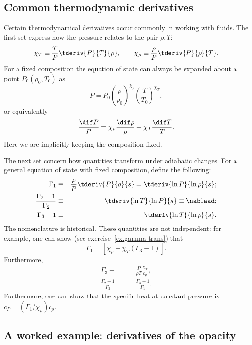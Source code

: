 \subsection{Common thermodynamic derivatives}

Certain thermodynamical derivatives occur commonly in working with fluids. The first set express how the pressure relates to the pair $\rho,T$:
\begin{equation}
\chi_{T}\equiv\frac{T}{P}\tderiv{P}{T}{\rho},\qquad\chi_{\rho}\equiv\frac{\rho}{P}\tderiv{P}{\rho}{T}.
\end{equation}
For a fixed composition the equation of state can always be expanded about a point $P_{0}(\rho_{0},T_{0})$ as
\begin{equation}\label{e.eos}
P = P_{0}\left(\frac{\rho}{\rho_{0}}\right)^{\chi_{\rho}}\left(\frac{T}{T_{0}}\right)^{\chi_{T}},
\end{equation}
or equivalently
\[
\frac{\dif P}{P} = \chi_{\rho}\frac{\dif \rho}{\rho} + \chi_{T}\frac{\dif T}{T}.
\]
Here we are implicitly keeping the composition fixed.

The next set concern how quantities transform under adiabatic changes.  For a general equation of state with fixed composition, define the following:
\begin{eqnarray}
\Gamma_{1} &\equiv& \frac{\rho}{P}\tderiv{P}{\rho}{s} = \tderiv{\ln P}{\ln\rho}{s};\\
\frac{\Gamma_{2}-1}{\Gamma_{2}} &\equiv& \tderiv{\ln T}{\ln P}{s} \equiv \nablaad;\\
\Gamma_{3}-1 &\equiv& \tderiv{\ln T}{\ln \rho}{s}.
\end{eqnarray}
The nomenclature is historical. These quantities are not independent: for example, one can show (see exercise~\ref{ex.gamma-trans}) that
\[
\Gamma_{1} = \left[\chi_{\rho} + \chi_{T}\left(\Gamma_{3}-1\right)\right].
\]
Furthermore,
\begin{eqnarray*}
\Gamma_{3}-1 &=& \frac{P}{\rho T}\frac{\chi_{T}}{c_{\rho}},\\
\frac{\Gamma_{2}-1}{\Gamma_{2}} &=& \frac{\Gamma_{3}-1}{\Gamma_{1}}.
\end{eqnarray*}
Furthermore, one can show that the specific heat at constant pressure is $c_{P} = (\Gamma_{1}/\chi_{\rho})c_{\rho}$.

\subsection{A worked example: derivatives of the opacity}

